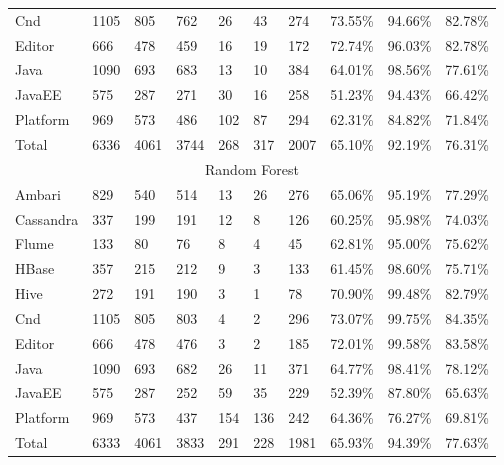 \begin{table}[]
{\begin{tabular}{llllllllll}
Cnd & 1105 & 805 & 762 & 26 & 43 & 274 & 73.55\% & 94.66\% & 82.78\% \\
Editor & 666 & 478 & 459 & 16 & 19 & 172 & 72.74\% & 96.03\% & 82.78\% \\
Java & 1090 & 693 & 683 & 13 & 10 & 384 & 64.01\% & 98.56\% & 77.61\% \\
JavaEE & 575 & 287 & 271 & 30 & 16 & 258 & 51.23\% & 94.43\% & 66.42\% \\
Platform & 969 & 573 & 486 & 102 & 87 & 294 & 62.31\% & 84.82\% & 71.84\% \\
Total & 6336 & 4061 & 3744 & 268 & 317 & 2007 & 65.10\% & 92.19\% & 76.31\% \\ \hline
\multicolumn{10}{c}{Random Forest} \\ \hline
Ambari & 829 & 540 & 514 & 13 & 26 & 276 & 65.06\% & 95.19\% & 77.29\% \\
Cassandra & 337 & 199 & 191 & 12 & 8 & 126 & 60.25\% & 95.98\% & 74.03\% \\
Flume & 133 & 80 & 76 & 8 & 4 & 45 & 62.81\% & 95.00\% & 75.62\% \\
HBase & 357 & 215 & 212 & 9 & 3 & 133 & 61.45\% & 98.60\% & 75.71\% \\
Hive & 272 & 191 & 190 & 3 & 1 & 78 & 70.90\% & 99.48\% & 82.79\% \\
Cnd & 1105 & 805 & 803 & 4 & 2 & 296 & 73.07\% & 99.75\% & 84.35\% \\
Editor & 666 & 478 & 476 & 3 & 2 & 185 & 72.01\% & 99.58\% & 83.58\% \\
Java & 1090 & 693 & 682 & 26 & 11 & 371 & 64.77\% & 98.41\% & 78.12\% \\
JavaEE & 575 & 287 & 252 & 59 & 35 & 229 & 52.39\% & 87.80\% & 65.63\% \\
Platform & 969 & 573 & 437 & 154 & 136 & 242 & 64.36\% & 76.27\% & 69.81\% \\
Total & 6333 & 4061 & 3833 & 291 & 228 & 1981 & 65.93\% & 94.39\% & 77.63\% \\ \hline
\end{tabular}%
}
\end{table}